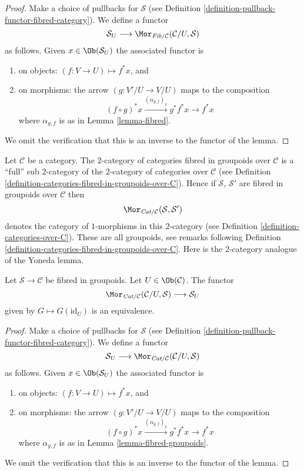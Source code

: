 \begin{proof}
Make a choice of pullbacks for $\mathcal{S}$
(see Definition \ref{definition-pullback-functor-fibred-category}).
We define a functor
$$
\mathcal{S}_U
\longrightarrow
\Mor_{\textit{Fib}/\mathcal{C}}(\mathcal{C}/U, \mathcal{S})
$$
as follows. Given
$x \in \Ob(\mathcal{S}_U)$
the associated functor is
\begin{enumerate}
\item on objects: $(f : V \to U) \mapsto f^*x$, and
\item on morphisms: the arrow $(g : V'/U \to V/U)$ maps to
the composition
$$
(f \circ g)^*x \xrightarrow{(\alpha_{g, f})_x} g^*f^*x \rightarrow f^*x
$$
where $\alpha_{g, f}$ is as in Lemma \ref{lemma-fibred}.
\end{enumerate}
We omit the verification that this is an inverse to the functor
of the lemma.
\end{proof}

\noindent
Let $\mathcal{C}$ be a category. The $2$-category of categories
fibred in groupoids over $\mathcal{C}$ is a
``full'' sub $2$-category of the $2$-category of categories over
$\mathcal{C}$ (see
Definition \ref{definition-categories-fibred-in-groupoids-over-C}).
Hence if $\mathcal{S}$, $\mathcal{S}'$ are fibred in groupoids
over $\mathcal{C}$ then
$$
\Mor_{\textit{Cat}/\mathcal{C}}(\mathcal{S}, \mathcal{S}')
$$
denotes the category of $1$-morphisms in this $2$-category
(see Definition \ref{definition-categories-over-C}).
These are all groupoids, see remarks following
Definition \ref{definition-categories-fibred-in-groupoids-over-C}.
Here is the $2$-category analogue of the Yoneda lemma.

\begin{lemma}
\label{lemma-yoneda-2category}
Let $\mathcal{S}\to \mathcal{C}$ be fibred in groupoids.
Let $U \in \Ob(\mathcal{C})$.
The functor
$$
\Mor_{\textit{Cat}/\mathcal{C}}(\mathcal{C}/U, \mathcal{S})
\longrightarrow
\mathcal{S}_U
$$
given by $G \mapsto G(\text{id}_U)$ is an equivalence.
\end{lemma}

\begin{proof}
Make a choice of pullbacks for $\mathcal{S}$
(see Definition \ref{definition-pullback-functor-fibred-category}).
We define a functor
$$
\mathcal{S}_U
\longrightarrow
\Mor_{\textit{Cat}/\mathcal{C}}(\mathcal{C}/U, \mathcal{S})
$$
as follows. Given
$x \in \Ob(\mathcal{S}_U)$
the associated functor is
\begin{enumerate}
\item on objects: $(f : V \to U) \mapsto f^*x$, and
\item on morphisms: the arrow $(g : V'/U \to V/U)$ maps to
the composition
$$
(f \circ g)^*x \xrightarrow{(\alpha_{g, f})_x} g^*f^*x \rightarrow f^*x
$$
where $\alpha_{g, f}$ is as in Lemma \ref{lemma-fibred-groupoids}.
\end{enumerate}
We omit the verification that this is an inverse to the functor
of the lemma.
\end{proof}

